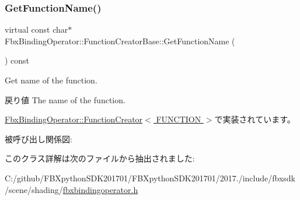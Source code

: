 \subsubsection{\texorpdfstring{Get\+Function\+Name()}{GetFunctionName()}}
{\footnotesize\ttfamily virtual const char$\ast$ Fbx\+Binding\+Operator\+::\+Function\+Creator\+Base\+::\+Get\+Function\+Name (\begin{DoxyParamCaption}{ }\end{DoxyParamCaption}) const\hspace{0.3cm}{\ttfamily [pure virtual]}}

Get name of the function. \begin{DoxyReturn}{戻り値}
The name of the function. 
\end{DoxyReturn}


\hyperlink{class_fbx_binding_operator_1_1_function_creator_ae54e4bf8030e91bcd1b6fe5e9126be9d}{Fbx\+Binding\+Operator\+::\+Function\+Creator$<$ F\+U\+N\+C\+T\+I\+O\+N $>$}で実装されています。

被呼び出し関係図\+:


このクラス詳解は次のファイルから抽出されました\+:\begin{DoxyCompactItemize}
\item 
C\+:/github/\+F\+B\+Xpython\+S\+D\+K201701/\+F\+B\+Xpython\+S\+D\+K201701/2017./include/fbxsdk/scene/shading/\hyperlink{fbxbindingoperator_8h}{fbxbindingoperator.\+h}\end{DoxyCompactItemize}
